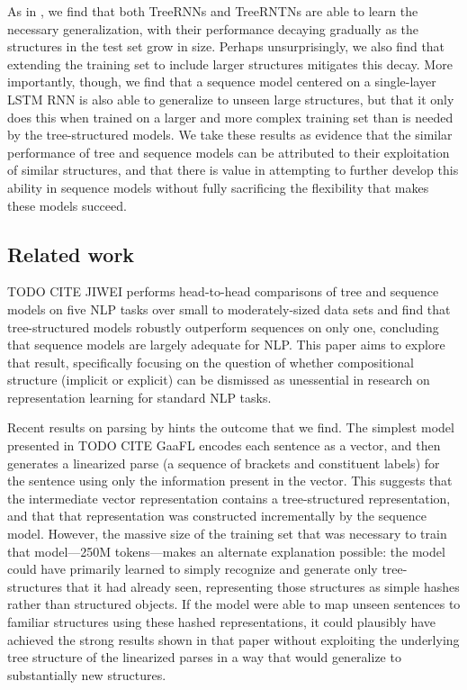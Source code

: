 As in , we find that both TreeRNNs and TreeRNTNs are able to learn the necessary generalization, with their performance decaying gradually as the structures in the test set grow in size. Perhaps unsurprisingly, we also find that extending the training set to include larger structures mitigates this decay. More importantly, though, we find that a sequence model centered on a single-layer LSTM RNN is also able to generalize to unseen large structures, but that it only does this when trained on a larger and more complex training set than is needed by the tree-structured models. We take these results as evidence that the similar performance of tree and sequence models can be attributed to their exploitation of similar structures, and that there is value in attempting to further develop this ability in sequence models without fully sacrificing the flexibility that makes these models succeed.

\subsection{Related work}

TODO CITE JIWEI performs head-to-head comparisons of tree and sequence models on five NLP tasks over small to moderately-sized data sets and find that tree-structured models robustly outperform sequences on only one, concluding that sequence models are largely adequate for NLP. This paper aims to explore that result, specifically focusing on the question of whether compositional structure (implicit or explicit) can be dismissed as unessential in research on representation learning for standard NLP tasks.

Recent results on parsing by  hints the outcome that we find. The simplest model presented in TODO CITE GaaFL encodes each sentence as a vector, and then generates a linearized parse (a sequence of brackets and constituent labels) for the sentence using only the information present in the vector. This suggests that the intermediate vector representation contains a tree-structured representation, and that that representation was constructed incrementally by the sequence model. However, the massive size of the training set that was necessary to train that model---250M tokens---makes an alternate explanation possible: the model could have primarily learned to simply recognize and generate only tree-structures that it had already seen, representing those structures as simple hashes rather than structured objects. If the model were able to map unseen sentences to familiar structures using these hashed representations, it could plausibly have achieved the strong results shown in that paper without exploiting the underlying tree structure of the linearized parses in a way that would generalize to substantially new structures.
